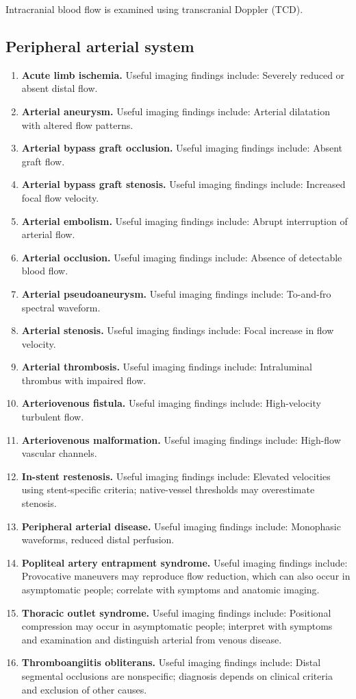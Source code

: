 Intracranial blood flow is examined using transcranial Doppler (TCD).

\subsection{Peripheral arterial system}
\begin{enumerate}[leftmargin=*,itemsep=0.45em,topsep=0.4em]
\item \textbf{Acute limb ischemia.} Useful imaging findings include: Severely reduced or absent distal flow.
\item \textbf{Arterial aneurysm.} Useful imaging findings include: Arterial dilatation with altered flow patterns.
\item \textbf{Arterial bypass graft occlusion.} Useful imaging findings include: Absent graft flow.
\item \textbf{Arterial bypass graft stenosis.} Useful imaging findings include: Increased focal flow velocity.
\item \textbf{Arterial embolism.} Useful imaging findings include: Abrupt interruption of arterial flow.
\item \textbf{Arterial occlusion.} Useful imaging findings include: Absence of detectable blood flow.
\item \textbf{Arterial pseudoaneurysm.} Useful imaging findings include: To-and-fro spectral waveform.
\item \textbf{Arterial stenosis.} Useful imaging findings include: Focal increase in flow velocity.
\item \textbf{Arterial thrombosis.} Useful imaging findings include: Intraluminal thrombus with impaired flow.
\item \textbf{Arteriovenous fistula.} Useful imaging findings include: High-velocity turbulent flow.
\item \textbf{Arteriovenous malformation.} Useful imaging findings include: High-flow vascular channels.
\item \textbf{In-stent restenosis.} Useful imaging findings include: Elevated velocities using stent-specific criteria; native-vessel thresholds may overestimate stenosis.
\item \textbf{Peripheral arterial disease.} Useful imaging findings include: Monophasic waveforms, reduced distal perfusion.
\item \textbf{Popliteal artery entrapment syndrome.} Useful imaging findings include: Provocative maneuvers may reproduce flow reduction, which can also occur in asymptomatic people; correlate with symptoms and anatomic imaging.
\item \textbf{Thoracic outlet syndrome.} Useful imaging findings include: Positional compression may occur in asymptomatic people; interpret with symptoms and examination and distinguish arterial from venous disease.
\item \textbf{Thromboangiitis obliterans.} Useful imaging findings include: Distal segmental occlusions are nonspecific; diagnosis depends on clinical criteria and exclusion of other causes.
\end{enumerate}

